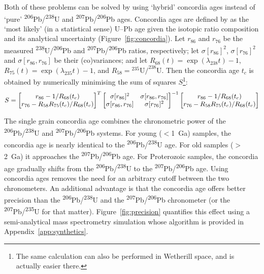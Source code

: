 \documentclass[gchron, manuscript]{copernicus}
\begin{document}
Both of these problems can be solved by using `hybrid' concordia ages
instead of `pure' \textsuperscript{206}Pb/\textsuperscript{238}U and
\textsuperscript{207}Pb/\textsuperscript{206}Pb ages. Concordia ages
are defined by \citet{ludwig1998} as the `most likely' (in a
statistical sense) U--Pb age given the isotopic ratio composition and
its analytical uncertainty (Figure~\ref{fig:concordia}).  Let $r_{86}$
and $r_{76}$ be the measured
\textsuperscript{238}U/\textsuperscript{206}Pb and
\textsuperscript{207}Pb/\textsuperscript{206}Pb ratios, respectively;
let $\sigma[r_{86}]^2$, $\sigma[r_{76}]^2$ and $\sigma[r_{86},r_{76}]$
be their (co)variances; and let $R_{68}(t) = \exp(\lambda_{238}t) -
1$, $R_{75}(t) = \exp(\lambda_{235}t) - 1$, and $R_{58} =
{}^{235}\mbox{U/}^{238}\mbox{U}$.  Then the concordia age $t_c$ is
obtained by numerically minimising the sum of squares $S$\footnote{The
  same calculation can also be performed in Wetherill space, and is
  actually easier there.}:
\begin{equation}
  S = \left[
    \begin{array}{@{}c@{}}
      r_{86} - 1/R_{68}(t_c) \\
      r_{76} - R_{58} R_{75}(t_c)/R_{68}(t_c)
    \end{array}
    \right]^T\left[
    \begin{array}{@{}cc@{}}
      \sigma[r_{86}]^2 & \sigma[r_{86},r_{76}] \\
      \sigma[r_{86},r_{76}] & \sigma[r_{76}]^2
    \end{array}
    \right]^{-1}
  \left[
    \begin{array}{@{}c@{}}
      r_{86} - 1/R_{68}(t_c) \\
      r_{76} - R_{58} R_{75}(t_c)/R_{68}(t_c)
    \end{array}
    \right]
  \label{eq:S}
\end{equation}

The single grain concordia age combines the chronometric power of the
\textsuperscript{206}Pb/\textsuperscript{238}U and
\textsuperscript{207}Pb/\textsuperscript{206}Pb systems. For young
($<$1~Ga) samples, the concordia age is nearly identical to the
\textsuperscript{206}Pb/\textsuperscript{238}U age. For old samples
($>$2~Ga) it approaches the
\textsuperscript{207}Pb/\textsuperscript{206}Pb age. For Proterozoic
samples, the concordia age gradually shifts from the
\textsuperscript{206}Pb/\textsuperscript{238}U to the
\textsuperscript{207}Pb/\textsuperscript{206}Pb age. Using concordia
ages removes the need for an arbitrary cutoff between the two
chronometers. An additional advantage is that the concordia age offers
better precision than the
\textsuperscript{206}Pb/\textsuperscript{238}U and the
\textsuperscript{207}Pb/\textsuperscript{206}Pb chronometer (or the
\textsuperscript{207}Pb/\textsuperscript{235}U for that matter).
Figure~\ref{fig:precision} quantifies this effect using a
semi-analytical mass spectrometry simulation whose algorithm is
provided in Appendix~\ref{app:synthetics}.
\end{document}
